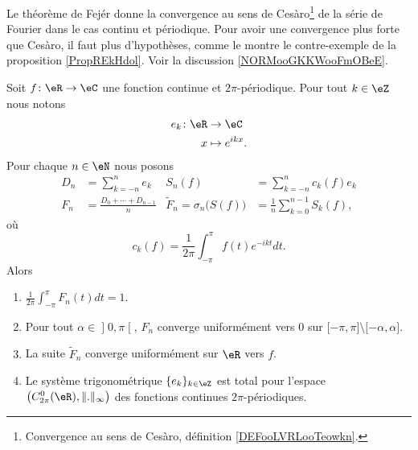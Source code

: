 Le théorème de Fejér donne la convergence au sens de Cesàro\footnote{Convergence au sens de Cesàro, définition \ref{DEFooLVRLooTeowkn}.} de la série de Fourier dans le cas continu et périodique. Pour avoir une convergence plus forte que Cesàro, il faut plus d'hypothèses, comme le montre le contre-exemple de la proposition \ref{PropREkHdol}. Voir la discussion \ref{NORMooGKKWooFmOBeE}.
\begin{theorem}[Fejér]      \label{ThoJFqczow}
	Soit \( f\colon \eR\to \eC\) une fonction continue et \( 2\pi\)-périodique. Pour tout \( k\in \eZ\) nous notons
	\begin{equation}
		\begin{aligned}
			e_k\colon \eR & \to \eC          \\
			x             & \mapsto e^{ikx}.
		\end{aligned}
	\end{equation}
	Pour chaque \( n\in \eN\) nous posons
	\begin{subequations}
		\begin{align}
			D_n & =\sum_{k=-n}^ne_k                   & S_n(f)                              & =\sum_{k=-n}^nc_k(f)e_k               \\
			F_n & =\frac{ D_0+\cdots + D_{n-1} }{ n } & \tilde F_n=\sigma_n\big( S(f) \big) & =\frac{1}{ n }\sum_{k=0}^{n-1}S_k(f),
		\end{align}
	\end{subequations}
	où
	\begin{equation}
		c_k(f)=\frac{1}{ 2\pi }\int_{-\pi}^{\pi}f(t) e^{-ikt}dt.
	\end{equation}
	Alors
	\begin{enumerate}
		\item
		      \( \frac{1}{ 2\pi }\int_{-\pi}^{\pi}F_n(t)dt=1\).
		\item
		      Pour tout \( \alpha\in \mathopen] 0 , \pi \mathclose[\), \( F_n\) converge uniformément vers \( 0\) sur \( \mathopen[ -\pi , \pi \mathclose]\setminus\mathopen[ -\alpha , \alpha \mathclose]\).
		\item
		      La suite \( \tilde F_n \) converge uniformément sur \( \eR\) vers \( f\).
		\item   \label{ItemUNQSPmyiv}
		      Le système trigonométrique \( \{ e_k \}_{k\in\eZ}\) est total pour l'espace \( \big( C^0_{2\pi}(\eR),\| . \|_{\infty} \big)\) des fonctions continues \( 2\pi\)-périodiques.
	\end{enumerate}
\end{theorem}

